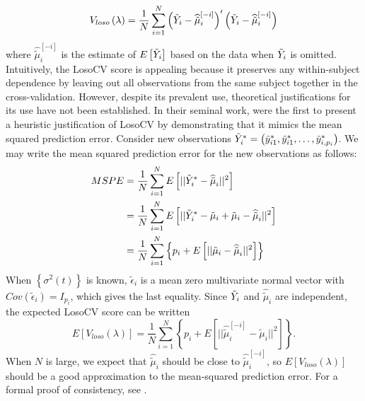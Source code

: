 \begin{equation} \label{eq:LOSOCV}
V_{loso}\left(\lambda\right) = \frac{1}{N}\sum_{i=1}^N \left( \tilde{Y}_i - \widehat{\tilde{\mu}}^{\left[-i\right]}_{i}\right)'\left( \tilde{Y}_i -  \widehat{\tilde{\mu}}^{\left[-i\right]}_{i}\right)
\end{equation}
\noindent
where $\widehat{\tilde{\mu}}^{\left[-i\right]}_{i}$ is the estimate of $E\left[ \tilde{Y}_i \right]$ based on the data when $\tilde{Y}_i$ is omitted. Intuitively, the LosoCV score is appealing because it preserves any within-subject dependence by leaving out all observations from the same subject together in the cross-validation.  However, despite its prevalent use, theoretical justifications for its use have not been established. In their seminal work, \cite{rice1991estimating} were the first to present a heuristic justification of LosoCV by demonstrating that it mimics the mean squared prediction error. Consider new observations $\tilde{Y}^*_i = \left(\tilde{y}_{i1}^*, \tilde{y}_{i1}^*, \dots, \tilde{y}_{i, p_i}^*\right)$. We may write the mean squared prediction error for the new observations as follows:  
\bigskip 
\begin{align}
\begin{split}\label{eq:MSPE}
MSPE &= \frac{1}{N}\sum_{i=1}^N E\left[ \vert \vert \tilde{Y}^*_i - \widehat{\tilde{\mu}}_{i} \vert \vert^2 \right]\\
&=  \frac{1}{N}\sum_{i=1}^N E\left[ \vert \vert \tilde{Y}^*_i -  \tilde{\mu}_{i}+ \tilde{\mu}_{i} - \widehat{\tilde{\mu}}_{i} \vert \vert^2 \right]\\
&=  \frac{1}{N}\sum_{i=1}^N \left\{p_i + E\left[ \vert \vert \tilde{\mu}_{i} - \widehat{\tilde{\mu}}_{i} \vert \vert^2 \right] \right\}
\end{split}
\end{align}
\noindent
When $\left\{ \sigma^2\left(t\right)\right\}$ is known, $\tilde{\epsilon}_i$ is a mean zero multivariate normal vector with $Cov\left(\tilde{\epsilon}_i\right) = I_{p_i}$, which gives the last equality. Since $\tilde{Y}_i$ and $ \widehat{\tilde{\mu}}_{i} $ are independent, the expected LosoCV score can be written
\begin{equation} \label{eq:MSPE_LOSOCV}
E\left[V_{loso}\left(\lambda\right) \right] =  \frac{1}{N}\sum_{i=1}^N\left\{ p_i +  E\left[ \vert \vert \widehat{\tilde{\mu}}^{\left[ -i \right]}_{i} - \tilde{\mu}_{i} \vert \vert^2 \right] \right\}. 
\end{equation}
\noindent
When $N$ is large, we expect that $\widehat{\tilde{\mu}}_{i}$ should be close to $\widehat{\tilde{\mu}}^{\left[ -i \right]}_{i}$, so $E\left[V_{loso}\left(\lambda\right) \right]$ should be a good approximation to the mean-squared prediction error. For a formal proof of consistency, see \cite{xu2012asymptotic}.

